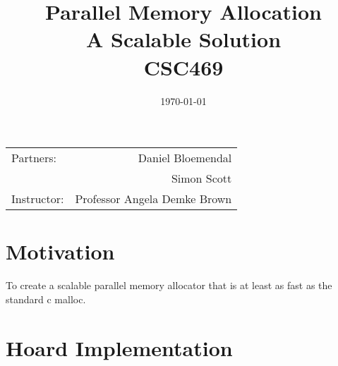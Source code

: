 \documentclass[11pt]{article}
\title{Parallel Memory Allocation \\ A Scalable Solution \\ CSC469} %
\date{\today} %
\begin{document}
\maketitle %

\begin{center}
\begin{tabular}{l r}
Partners: & Daniel Bloemendal \\ %
& Simon Scott \\
Instructor: & Professor Angela Demke Brown %
\end{tabular}
\end{center}



\section{Motivation}

To create a scalable parallel memory allocator that is at least as fast as the standard c malloc.


\section{Hoard Implementation}
\end{document}
